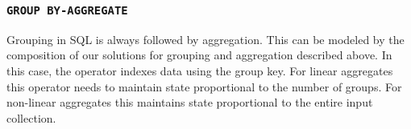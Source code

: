 \subsubsection{\texttt{GROUP BY-AGGREGATE}}

Grouping in SQL is always followed by aggregation.  This can be
modeled by the composition of our solutions for grouping and
aggregation described above.  In this case, the  operator
indexes data using the group key.  For linear aggregates this operator
needs to maintain state proportional to the number of groups.  For
non-linear aggregates this maintains state proportional to the entire
input collection.


%
%
%
%
%
%
%

